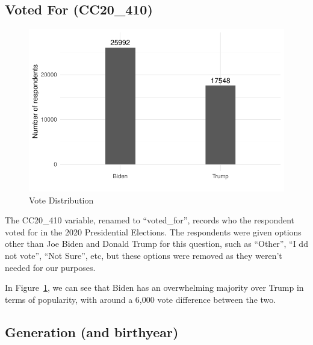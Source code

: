 \documentclass[
  letterpaper,
  DIV=11,
  numbers=noendperiod]{scrartcl}
\begin{document}
\hypertarget{sec-data-voted-for}{%
\subsection{Voted For (CC20\_410)}\label{sec-data-voted-for}}

\begin{figure}

{\centering \includegraphics{paper_files/figure-pdf/fig-vote-histogram-1.pdf}

}

\caption{\label{fig-vote-histogram}Vote Distribution}

\end{figure}

The CC20\_410 variable, renamed to ``voted\_for'', records who the
respondent voted for in the 2020 Presidential Elections. The respondents
were given options other than Joe Biden and Donald Trump for this
question, such as ``Other'', ``I dd not vote'', ``Not Sure'', etc, but
these options were removed as they weren't needed for our purposes.

In Figure~\ref{fig-vote-histogram}, we can see that Biden has an
overwhelming majority over Trump in terms of popularity, with around a
6,000 vote difference between the two.

\hypertarget{sec-data-generation}{%
\subsection{Generation (and birthyear)}\label{sec-data-generation}}
\end{document}
